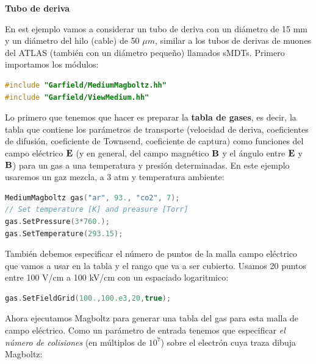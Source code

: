 
\begin{Ejemplo}{\textbf{Tubo de deriva}}

En est ejemplo vamos a considerar un tubo de deriva con un diámetro de 15 mm y un diámetro del hilo (cable) de 50 $\mu m$, similar a los tubos de derivas de muones del ATLAS (también con un diámetro pequeño) llamados sMDTs. Primero importamos los módulos: \\

\begin{lstlisting}[language=C++,style=c++]
#include "Garfield/MediumMagboltz.hh"
#include "Garfield/ViewMedium.hh"
\end{lstlisting}

\vspace*{1em}


Lo primero que tenemos que hacer es preparar la \textbf{tabla de gases}, es decir, la tabla que contiene los parámetros de transporte (velocidad de deriva, coeficientes de difusión, coeficiente de Townsend, coeficiente de captura) como funciones del campo eléctrico $\mathcal{\textbf{E}}$ (y en general, del campo magnético $\mathbf{B}$ y el ángulo entre $\mathcal{\textbf{E}}$ y $\mathbf{B}$) para un gas a una temperatura y presión determinadas. En este ejemplo usaremos un gaz mezcla, a 3 atm y temperatura ambiente: \\

\begin{lstlisting}[language=C++,style=c++]
MediumMagboltz gas("ar", 93., "co2", 7);
// Set temperature [K] and preasure [Torr]
gas.SetPressure(3*760.);
gas.SetTemperature(293.15);
\end{lstlisting}

\vspace*{1em}

También debemos especificar el número de puntos de la malla campo eléctrico que vamos a usar en la tabla y el rango que va a ser cubierto. Usamos 20 puntos entre 100 V/cm a 100 kV/cm con un espaciado logaritmico:   \\

\begin{lstlisting}[language=C++,style=c++]
gas.SetFieldGrid(100.,100.e3,20,true);
\end{lstlisting}

\vspace*{1em}
    
Ahora ejecutamos Magboltz para generar una tabla del gas para esta malla de campo eléctrico. Como un parámetro de entrada tenemos que especificar \textit{el número de colisiones} (en múltiplos de $10^7$) sobre el electrón cuya traza dibuja Magboltz: \\


\end{Ejemplo}
